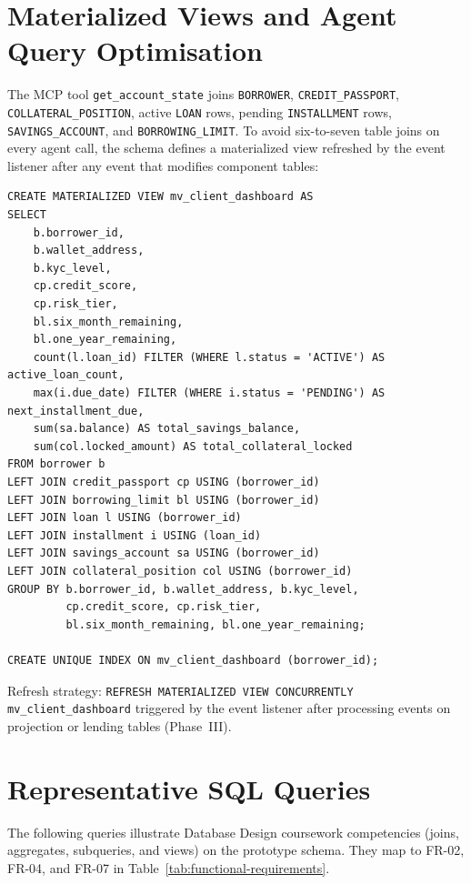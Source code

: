 \documentclass[12pt,a4paper]{report}
\begin{document}
\section{Materialized Views and Agent Query Optimisation}

The MCP tool \texttt{get\_account\_state} joins \texttt{BORROWER}, \texttt{CREDIT\_PASSPORT}, \texttt{COLLATERAL\_POSITION}, active \texttt{LOAN} rows, pending \texttt{INSTALLMENT} rows, \texttt{SAVINGS\_ACCOUNT}, and \texttt{BORROWING\_LIMIT}. To avoid six-to-seven table joins on every agent call, the schema defines a materialized view refreshed by the event listener after any event that modifies component tables:

\begin{verbatim}
CREATE MATERIALIZED VIEW mv_client_dashboard AS
SELECT
    b.borrower_id,
    b.wallet_address,
    b.kyc_level,
    cp.credit_score,
    cp.risk_tier,
    bl.six_month_remaining,
    bl.one_year_remaining,
    count(l.loan_id) FILTER (WHERE l.status = 'ACTIVE') AS active_loan_count,
    max(i.due_date) FILTER (WHERE i.status = 'PENDING') AS next_installment_due,
    sum(sa.balance) AS total_savings_balance,
    sum(col.locked_amount) AS total_collateral_locked
FROM borrower b
LEFT JOIN credit_passport cp USING (borrower_id)
LEFT JOIN borrowing_limit bl USING (borrower_id)
LEFT JOIN loan l USING (borrower_id)
LEFT JOIN installment i USING (loan_id)
LEFT JOIN savings_account sa USING (borrower_id)
LEFT JOIN collateral_position col USING (borrower_id)
GROUP BY b.borrower_id, b.wallet_address, b.kyc_level,
         cp.credit_score, cp.risk_tier,
         bl.six_month_remaining, bl.one_year_remaining;

CREATE UNIQUE INDEX ON mv_client_dashboard (borrower_id);
\end{verbatim}

\noindent Refresh strategy: \texttt{REFRESH MATERIALIZED VIEW CONCURRENTLY mv\_client\_dashboard} triggered by the event listener after processing events on projection or lending tables (Phase~III).

\section{Representative SQL Queries}
\label{sec:sql-queries}

The following queries illustrate Database Design coursework competencies (joins, aggregates, subqueries, and views) on the prototype schema. They map to FR-02, FR-04, and FR-07 in Table~\ref{tab:functional-requirements}.
\end{document}
